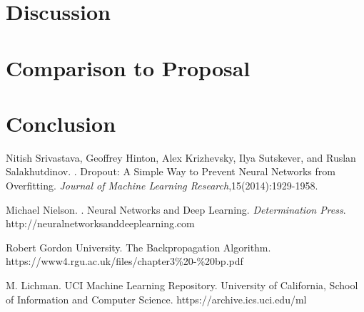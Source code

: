 \documentclass[11pt,letterpaper]{article}
\begin{document}
\section{Discussion}


\section{Comparison to Proposal}


\section{Conclusion}



\begin{thebibliography}{}

Nitish Srivastava, Geoffrey Hinton, Alex Krizhevsky, Ilya Sutskever, and Ruslan Salakhutdinov.
.
\newblock Dropout: A Simple Way to Prevent Neural Networks from Overfitting. {\em Journal of Machine Learning Research},15(2014):1929-1958.

Michael Nielson.
.
\newblock Neural Networks and Deep Learning. {\em Determination Press}.
\newblock http://neuralnetworksanddeeplearning.com

Robert Gordon University.
\newblock The Backpropagation Algorithm.
\newblock https://www4.rgu.ac.uk/files/chapter3\%20-\%20bp.pdf

M. Lichman.
\newblock UCI Machine Learning Repository.
\newblock University of California, School of Information and Computer Science.
\newblock https://archive.ics.uci.edu/ml
\end{thebibliography}
\end{document}

